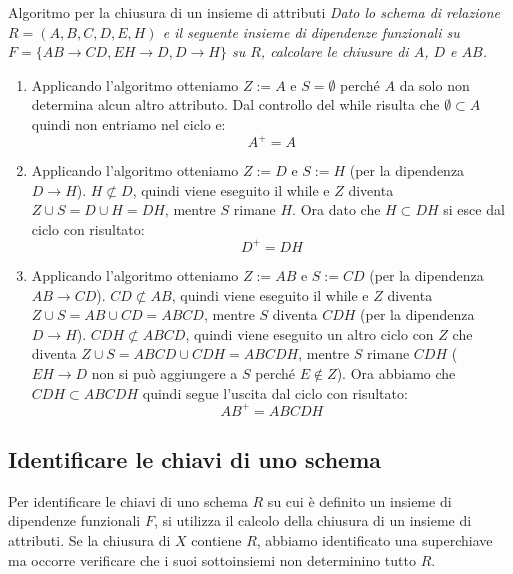 \begin{Example}{Algoritmo per la chiusura di un insieme di attributi}{}
    \textit{Dato lo schema di relazione $R = (A, B, C, D, E, H)$ e il seguente insieme di dipendenze funzionali su $F = \{ AB\to CD, EH\to D, D\to H \}$ su $R$, calcolare le chiusure di $A$, $D$ e $AB$.}

    \begin{enumerate}
        \item Applicando l'algoritmo otteniamo $Z:=A$ e $S=\emptyset$ perché $A$ da solo non determina alcun altro attributo. Dal controllo del while risulta che $\emptyset\subset A$ quindi non entriamo nel ciclo e:
        \begin{equation*}
            A^+=A
        \end{equation*}

        \item Applicando l'algoritmo otteniamo $Z:=D$ e $S:=H$ (per la dipendenza $D\to H$). $H\not\subset D$, quindi viene eseguito il while e $Z$ diventa $Z\cup S=D\cup H=DH$, mentre $S$ rimane $H$. Ora dato che $H\subset DH$ si esce dal ciclo con risultato:
        \begin{equation*}
            D^+=DH
        \end{equation*}

        \item Applicando l'algoritmo otteniamo $Z:=AB$ e $S:=CD$ (per la dipendenza $AB\to CD$). $CD\not\subset AB$, quindi viene eseguito il while e $Z$ diventa $Z\cup S=AB\cup CD=ABCD$, mentre $S$ diventa $CDH$ (per la dipendenza $D\to H$). $CDH\not\subset ABCD$, quindi viene eseguito un altro ciclo con $Z$ che diventa $Z\cup S=ABCD\cup CDH=ABCDH$, mentre $S$ rimane $CDH$ ($EH\to D$ non si può aggiungere a $S$ perché $E\notin Z$). Ora abbiamo che $CDH\subset ABCDH$ quindi segue l'uscita dal ciclo con risultato:
        \begin{equation*}
            AB^+=ABCDH
        \end{equation*}
    \end{enumerate}
\end{Example}

\subsection{Identificare le chiavi di uno schema}
Per identificare le chiavi di uno schema $R$ su cui è definito un insieme di dipendenze funzionali $F$, si utilizza il calcolo della chiusura di un insieme di attributi. Se la chiusura di $X$ contiene $R$, abbiamo identificato una superchiave ma occorre verificare che i suoi sottoinsiemi non determinino tutto $R$.

